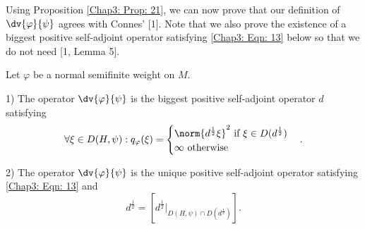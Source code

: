 Using Proposition \ref{Chap3: Prop: 21}, we can now prove that our definition of $\dv{\varphi}{\psi}$ agrees with Connes' [1]. Note that we also prove the existence of a biggest positive self-adjoint operator satisfying \eqref{Chap3: Eqn: 13} below so that we do not need [1, Lemma 5].
\begin{proposition}\label{Chap3: Prop: 22}
    Let $\varphi$ be a normal semifinite weight on $M$.\par
    1) The operator $\dv{\varphi}{\psi}$ is the biggest positive self-adjoint operator $d$ satisfying
    \begin{equation}\label{Chap3: Eqn: 13}
        \forall \xi\in D(H,\psi):q_\varphi(\xi)=\begin{cases}
            \norm{d^\frac{1}{2}\xi}^2\text{ if }\xi\in D(d^\frac{1}{2}) \\
            \infty\text{ otherwise }
        \end{cases}.
    \end{equation}\par
    2) The operator $\dv{\varphi}{\psi}$ is the unique positive self-adjoint operator satisfying \eqref{Chap3: Eqn: 13} and
    \begin{equation}\label{Chap3: Eqn: 14}
        d^\frac{1}{2}=\left[ d^\frac{1}{2}|_{D(H,\psi)\cap D(d^\frac{1}{2})} \right].
    \end{equation}
\end{proposition}
